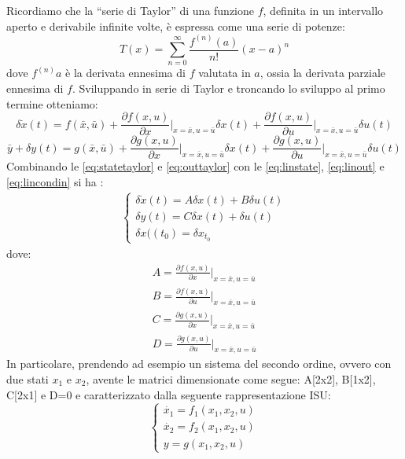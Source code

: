 \documentclass[a4paper]{report}
\begin{document}
Ricordiamo che la ``serie di Taylor'' di una
funzione $f$, definita in un intervallo aperto e derivabile infinite
volte, \`e espressa come una serie di potenze:
\begin{equation}\label{eq:serieDiTaylor}
  T(x) = \sum_{n=0}^{\infty} \dfrac{f^{(n)}(a)}{n!} (x - a)^n
\end{equation}
dove $f^{(n)}a$ \`e la derivata ennesima di $f$ valutata in $a$, ossia
la derivata parziale ennesima di $f$.
Sviluppando in serie di Taylor e troncando lo sviluppo al primo termine otteniamo:
\begin{equation}\label{eq:statetaylor}
  \delta \dot{x}(t)=f(\bar{x},\bar{u})+\frac{\partial f(x,u)}{\partial
    x} \Bigg |_{x=\bar{x},u=\bar{u}}\delta x(t)+\frac{\partial
    f(x,u)}{\partial u} \Bigg |_{x=\bar{x},u=\bar{u}}\delta u(t)
\end{equation}
\begin{equation}\label{eq:outtaylor}
  \bar{y}+\delta y(t)=g(\bar{x},\bar{u})+\frac{\partial
    g(x,u)}{\partial x} \Bigg |_{x=\bar{x},u=\bar{u}}\delta
  x(t)+\frac{\partial g(x,u)}{\partial u} \Bigg
  |_{x=\bar{x},u=\bar{u}}\delta u(t) 
\end{equation}
Combinando le \ref{eq:statetaylor} e \ref{eq:outtaylor} con le
\ref{eq:linstate}, \ref{eq:linout} e \ref{eq:lincondin} si ha : 
\begin{eqnarray}\label{eq:linsys}
  \left\{ \begin{array}{l}
    \delta \dot{x}(t)=A \delta x(t) + B \delta u(t)\\
    \delta y(t)=C \delta x(t) + \delta u(t)\\
    \delta x((t_0)=\delta x_{t_0}
  \end{array}\right.
\end{eqnarray}
dove:
\begin{eqnarray}\label{eq:linmatr}
  A=\frac{\partial f(x,u)}{\partial x} \Bigg |_{x=\bar{x},u=\bar{u}}\\
  B=\frac{\partial f(x,u)}{\partial u} \Bigg |_{x=\bar{x},u=\bar{u}}\\
  C=\frac{\partial g(x,u)}{\partial x }\Bigg |_{x=\bar{x},u=\bar{u}}\\
  D=\frac{\partial g(x,u)}{\partial u} \Bigg |_{x=\bar{x},u=\bar{u}}
\end{eqnarray}
In particolare, prendendo ad esempio un sistema del secondo ordine,
ovvero con due stati $x_1$ e $x_2$, avente le  matrici dimensionate
come segue: 
A[2x2], B[1x2], C[2x1] e D=0 e caratterizzato dalla seguente
rappresentazione ISU: 
\begin{equation}
  \left\{ \begin{array}{l}
    \dot{x_1}=f_1(x_1,x_2,u)\\
    \dot{x_2}=f_2(x_1,x_2,u)\\
    y=g(x_1, x_2, u)
  \end{array}\right.
\end{equation}
 
\end{document}
